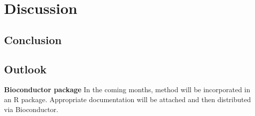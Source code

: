 

\chapter{Discussion}

\section{Conclusion}

\section{Outlook}

\textbf{Bioconductor package}
In the coming months, method will be incorporated in an R package. Appropriate documentation will be attached and then distributed via Bioconductor.
